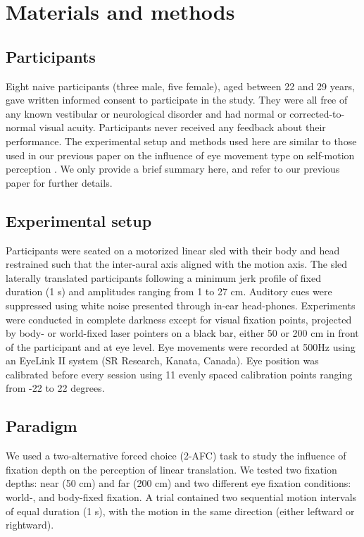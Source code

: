 \section{Materials and methods}
\label{p4:sec:methods}

\subsection{Participants}

Eight naive participants (three male, five female), aged between 22 and 29 years, gave written informed consent to participate in the study. They were all free of any known vestibular or neurological disorder and had normal or corrected-to-normal visual acuity. Participants never received any feedback about their performance.  The experimental setup and methods used here are similar to those used in our previous paper on the influence of eye movement type on self-motion perception \cite{clemens2015a}. We only provide a brief summary here, and refer to our previous paper for further details.

\subsection{Experimental setup}

Participants were seated on a motorized linear sled with their body and head restrained such that the inter-aural axis aligned with the motion axis. The sled laterally translated participants following a minimum jerk profile of fixed duration (1 \si{\second}) and amplitudes ranging from 1 to 27 \si{\centi\metre}. Auditory cues were suppressed using white noise presented through in-ear head-phones. Experiments were conducted in complete darkness except for visual fixation points, projected by body- or world-fixed laser pointers on a black bar, either 50 or 200 \si{\centi\metre} in front of the participant and at eye level. Eye movements were recorded at 500Hz using an EyeLink II system (SR Research, Kanata, Canada). Eye position was calibrated before every session using 11 evenly spaced calibration points ranging from -22 to 22 degrees.


\subsection{Paradigm}

We used a two-alternative forced choice (2-AFC) task to study the influence of fixation depth on the perception of linear translation. We tested two fixation depths: near (50 \si{\centi\metre}) and far (200 \si{\centi\metre}) and two different eye fixation conditions: world-, and body-fixed fixation. A trial contained two sequential motion intervals of equal duration (1 \si{\second}), with the motion in the same direction (either leftward or rightward).

